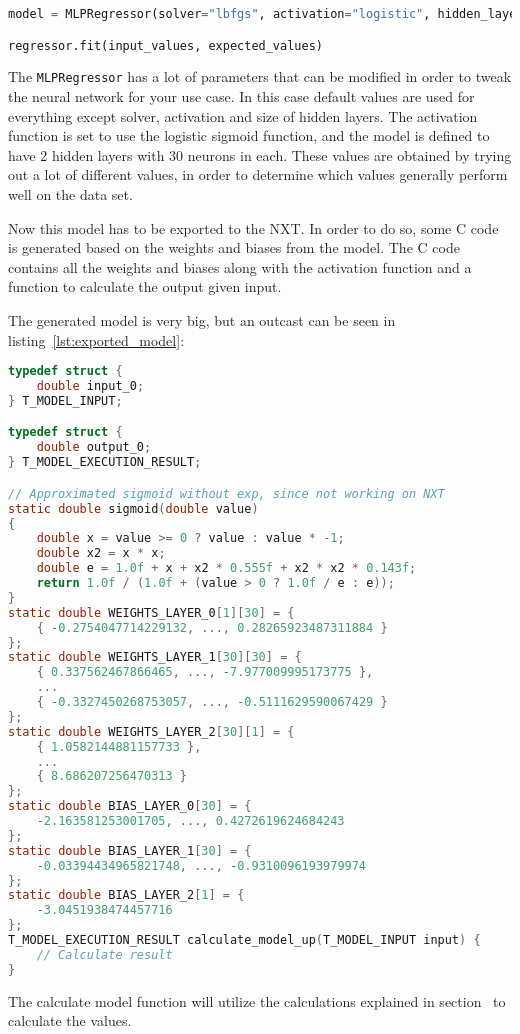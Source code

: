\begin{lstlisting}[language=python,label={lst:mlpregressor},caption={Training a MLPRegressor with scikit}]
model = MLPRegressor(solver="lbfgs", activation="logistic", hidden_layer_sizes=(30, 30))

regressor.fit(input_values, expected_values)
\end{lstlisting}

The \texttt{MLPRegressor} has a lot of parameters that can be modified in order to tweak the neural network for your use case.
In this case default values are used for everything except solver, activation and size of hidden layers.
The activation function is set to use the logistic sigmoid function, and the model is defined to have 2 hidden layers with 30 neurons in each.
These values are obtained by trying out a lot of different values, in order to determine which values generally perform well on the data set.


Now this model has to be exported to the NXT. 
In order to do so, some C code is generated based on the weights and biases from the model.
The C code contains all the weights and biases along with the activation function and a function to calculate the output given input.

The generated model is very big, but an outcast can be seen in listing~\ref{lst:exported_model}:


\begin{lstlisting}[language=C,label={lst:exported_model},caption={Autogenerated model for getting power to move up}]
typedef struct {
	double input_0;
} T_MODEL_INPUT;

typedef struct {
	double output_0;
} T_MODEL_EXECUTION_RESULT;

// Approximated sigmoid without exp, since not working on NXT
static double sigmoid(double value)
{
	double x = value >= 0 ? value : value * -1;
	double x2 = x * x;
	double e = 1.0f + x + x2 * 0.555f + x2 * x2 * 0.143f;
	return 1.0f / (1.0f + (value > 0 ? 1.0f / e : e));
}
static double WEIGHTS_LAYER_0[1][30] = {
	{ -0.2754047714229132, ..., 0.28265923487311884 }
};
static double WEIGHTS_LAYER_1[30][30] = {
	{ 0.337562467866465, ..., -7.977009995173775 },
	...
	{ -0.3327450268753057, ..., -0.5111629590067429 }
};
static double WEIGHTS_LAYER_2[30][1] = {
	{ 1.0582144881157733 },
	...
	{ 8.686207256470313 }
};
static double BIAS_LAYER_0[30] = {
	-2.163581253001705, ..., 0.4272619624684243
};
static double BIAS_LAYER_1[30] = {
	-0.03394434965821748, ..., -0.9310096193979974
};
static double BIAS_LAYER_2[1] = {
	-3.0451938474457716
};
T_MODEL_EXECUTION_RESULT calculate_model_up(T_MODEL_INPUT input) {
	// Calculate result
}

\end{lstlisting}

The calculate model function will utilize the calculations explained in section~ to calculate the values.


